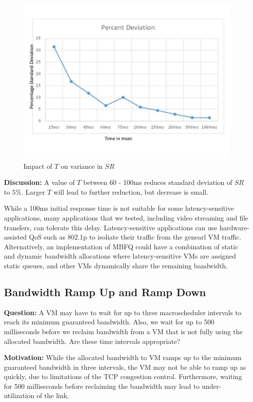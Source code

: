 \begin{figure}
\centering
\includegraphics[width=0.7\columnwidth, trim=60pt 20mm 0pt 8mm]{figures/variation}
\caption{Impact of $T$ on variance in $SR$}
\label{variation}
\vspace{-3mm}
\end{figure}

{\bf Discussion:} A value of $T$ between 60 - 100ms reduces standard deviation
of $SR$ to $5\%$.  Larger $T$ will lead to further reduction, but decrease is
small.

While a 100ms initial response time is not suitable for some latency-sensitive applications,
many applications that we tested, including video streaming and file transfers, can tolerate
this delay. Latency-sensitive applications can use hardware-assisted QoS such as 802.1p
to isoliate their traffic from the genearl VM traffic.  Alternatively, an implementation of MBFQ
could have a combination of static and dynamic bandwidth allocations where latency-sensitive
VMs are assigned static queues, and other VMs dynamically share the remaining bandwidth.

\subsection{Bandwidth Ramp Up and Ramp Down}
\label{sec:fairshare}
{\bf Question:} A VM may have to wait for up to three macroscheduler intervals to reach its
minimum guaranteed bandwidth. Also, we wait for up to 500 milliseconds before we
reclaim bandwidth from a VM that is not fully using the allocated bandwidth. Are
these time intervals appropriate?

{\bf Motivation:}  While the allocated bandwidth to VM ramps up to the minimum
guaranteed bandwidth in three intervals, the VM may not be able to ramp up as
quickly, due to limitations of the TCP congestion control. Furthermore, waiting
for 500 milliseconds before reclaiming the bandwidth may lead to
under-utilization of the link.

